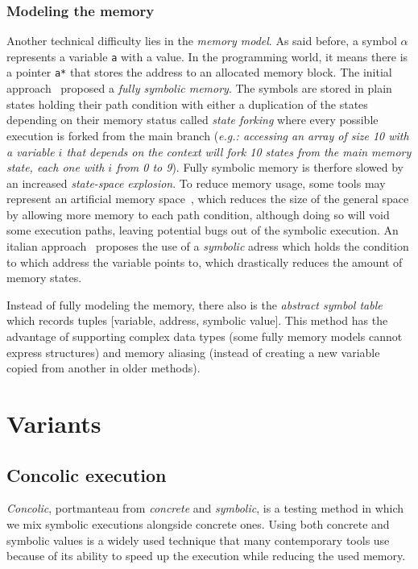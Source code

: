 \documentclass[11pt]{IEEEtran}
\begin{document}
      \subsubsection{Modeling the memory}
        Another technical difficulty lies in the \emph{memory model}. As said before, a symbol $\alpha$ represents a variable \texttt{a} with a value. In the programming world, it means there is a pointer \texttt{a*} that stores the address to an allocated memory block. The initial approach~\cite{newapproach} proposed a \emph{fully symbolic memory}. The symbols are stored in plain states holding their path condition with either a duplication of the states depending on their memory status called \emph{state forking} where every possible execution is forked from the main branch (\emph{e.g.: accessing an array of size 10 with a variable $i$ that depends on the context will fork 10 states from the main memory state, each one with $i$ from 0 to 9}). Fully symbolic memory is therfore slowed by an increased \emph{state-space explosion}. To reduce memory usage, some tools may represent an artificial memory space~\cite{5635129}, which reduces the size of the general space by allowing more memory to each path condition, although doing so will void some execution paths, leaving potential bugs out of the symbolic execution. An italian approach~\cite{memorymodelpointers} proposes the use of a \emph{symbolic} adress which holds the condition to which address the variable points to, which drastically reduces the amount of memory states.

        Instead of fully modeling the memory, there also is the \emph{abstract symbol table}~\cite{memorytablemodel} which records tuples [variable, address, symbolic value]. This method has the advantage of supporting complex data types (some fully memory models cannot express structures) and memory aliasing (instead of creating a new variable copied from another in older methods).
  \section{Variants}
    \subsection{Concolic execution}
    \label{subsec:concolicExecution}
    	\emph{Concolic}, portmanteau from \emph{concrete} and \emph{symbolic}, is a testing method in which we mix symbolic executions alongside concrete ones. Using both concrete and symbolic values is a widely used technique that many contemporary tools use because of its ability to speed up the execution while reducing the used memory.\\
\end{document}
